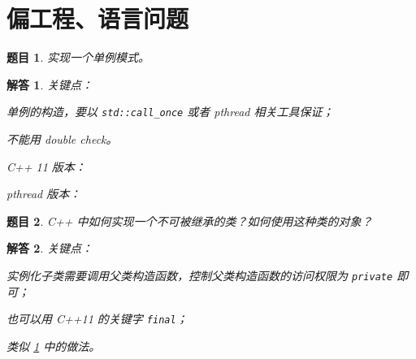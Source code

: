 \documentclass[UTF8, final]{ctexart}
\newtheorem{question}{题目}
\newtheorem{solution}{解答}
\begin{document}
\section{偏工程、语言问题}
\begin{question}
\label{q:singleton}
实现一个单例模式。
\end{question}
\begin{solution}
关键点：
\begin{compactitem}
    \item 单例的构造，要以 \lstinline[style=lcpp]|std::call_once| 或者 \textsf{pthread} 相关工具保证；
    \item 不能用 double check。
\end{compactitem}
C++ 11 版本：


\textsf{pthread} 版本：

\end{solution}

\begin{question}
C++ 中如何实现一个不可被继承的类？如何使用这种类的对象？
\end{question}
\begin{solution}
关键点：
\begin{compactitem}
    \item 实例化子类需要调用父类构造函数，控制父类构造函数的访问权限为 \lstinline[style=lcpp]|private| 即可；
    \item 也可以用 C++11 的关键字 \lstinline[style=lcpp]|final|；
    \item 类似 \ref{q:singleton} 中的做法。
\end{compactitem}
\end{solution}
\end{document}
